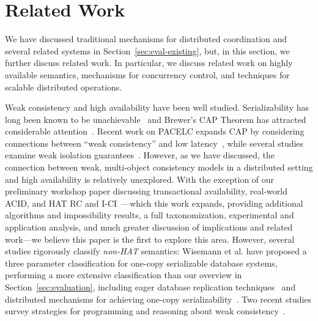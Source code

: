 
\section{Related Work}
\label{sec:relatedwork}

We have discussed traditional mechanisms for distributed
coordination and several related systems in
Section~\ref{sec:eval-existing}, but, in this section, we further discuss
related work. In particular, we discuss related work on highly
available semantics, mechanisms for concurrency control, and
techniques for scalable distributed operations.

Weak consistency and high availability have been well
studied. Serializability has long been known to be
unachievable~\cite{davidson-survey} and Brewer's CAP Theorem has
attracted considerable attention~\cite{gilbert-cap}. Recent work on
PACELC expands CAP by considering connections between ``weak
consistency'' and low latency~\cite{abadi-pacelc}, while several
studies examine weak isolation guarantees~\cite{adya,
  ansicritique}. However, as we have discussed, the connection between
weak, multi-object consistency models in a distributed setting and
high availability is relatively unexplored. With the exception of our
preliminary workshop paper discussing transactional availability,
real-world ACID, and HAT RC and I-CI~\cite{hat-hotos}---which this
work expands, providing additional algorithms and impossibility
results, a full taxonomization, experimental and application analysis,
and much greater discussion of implications and related work---we
believe this paper is the first to explore this area. However, several
studies rigorously classify \textit{non-HAT} semantics: Wisemann et
al. have proposed a three parameter classification for one-copy
serializable database systems, performing a more extensive
classification than our overview in Section~\ref{sec:evaluation},
including eager database replication
techniques~\cite{kemme-classification} and distributed mechanisms for
achieving one-copy serializability~\cite{wisemann-survey}. Two recent
studies survey strategies for programming and reasoning about weak
consistency~\cite{bailis-ec, bernstein-survey}.


